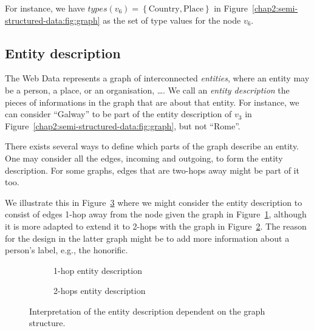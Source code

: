 For instance, we have $types\left(v_6\right) = \left\{ \text{Country}, \text{Place} \right\}$ in Figure~\ref{chap2:semi-structured-data:fig:graph} as the set of type values for the node $v_6$.

\subsection{Entity description}
\label{chap2:semi-structured-data:entity-description}

The Web Data represents a graph of interconnected \emph{entities}, where an entity may be a person, a place, or an organisation, \ldots. We call an \emph{entity description} the pieces of informations in the graph that are about that entity. For instance, we can consider ``Galway'' to be part of the entity description of $v_3$ in Figure~\ref{chap2:semi-structured-data:fig:graph}, but not ``Rome''.

There exists several ways to define which parts of the graph describe an entity. One may consider all the edges, incoming and outgoing, to form the entity description. For some graphs, edges that are two-hops away might be part of it too.

We illustrate this in Figure~\ref{chap2:semi-structured-data:fig:edesc} where we might consider the entity description to consist of edges 1-hop away from the node given the graph in Figure~\ref{chap2:semi-structured-data:fig:edesc1}, although it is more adapted to extend it to 2-hops with the graph in Figure~\ref{chap2:semi-structured-data:fig:edesc2}. The reason for the design in the latter graph might be to add more information about a person's label, e.g., the honorific.

\begin{figure}
	\centering
	\begin{subfigure}[b]{.45\textwidth}
		\resizebox{.6\textwidth}{!}{
			
		}
		\caption{1-hop entity description}
		\label{chap2:semi-structured-data:fig:edesc1}
	\end{subfigure}
	\quad
	\begin{subfigure}[b]{.45\textwidth}
		\resizebox{\textwidth}{!}{
			
		}
		\caption{2-hops entity description}
		\label{chap2:semi-structured-data:fig:edesc2}
	\end{subfigure}
	\caption{Interpretation of the entity description dependent on the graph structure.}
	\label{chap2:semi-structured-data:fig:edesc}
\end{figure}

